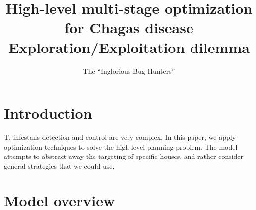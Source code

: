 \documentclass[english]{paper}
\begin{document}
\title{High-level multi-stage optimization for Chagas disease Exploration/Exploitation
dilemma}


\author{The ``Inglorious Bug Hunters''}

\maketitle

\section{Introduction}

T. infestans detection and control are very complex. In this paper,
we apply optimization techniques to solve the high-level planning
problem. The model attempts to abstract away the targeting of specific
houses, and rather consider general strategies that we could use.


\section{Model overview}
\end{document}
